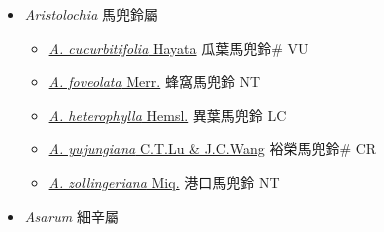 
  \begin{itemize}
 \item[] \textit{Aristolochia} 馬兜鈴屬
                    
  \begin{itemize}
        \item[] \href{http://www.theplantlist.org/tpl1.1/search?q=Aristolochia+cucurbitifolia}{\textit{A. cucurbitifolia} Hayata}   瓜葉馬兜鈴\# VU
        \item[] \href{http://www.theplantlist.org/tpl1.1/search?q=Aristolochia+foveolata}{\textit{A. foveolata} Merr.}   蜂窩馬兜鈴 NT
        \item[] \href{http://www.theplantlist.org/tpl1.1/search?q=Aristolochia+heterophylla}{\textit{A. heterophylla} Hemsl.}   異葉馬兜鈴 LC
        \item[] \href{http://www.theplantlist.org/tpl1.1/search?q=Aristolochia+yujungiana}{\textit{A. yujungiana} C.T.Lu \& J.C.Wang}   裕榮馬兜鈴\# CR
        \item[] \href{http://www.theplantlist.org/tpl1.1/search?q=Aristolochia+zollingeriana}{\textit{A. zollingeriana} Miq.}   港口馬兜鈴 NT
  \end{itemize}
 \item[] \textit{Asarum} 細辛屬
                    

\end{itemize}
